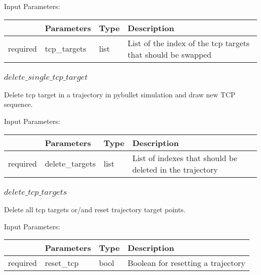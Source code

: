 \documentclass[
	ngerman,
	accentcolor=9c,%
	type=intern,
	marginpar=false
	]{tudapub}
\begin{document}
\vspace{0.5cm}
\noindent Input Parameters:
\vspace{0.5cm}

\begin{tabular}{|p{}|p{}|p{}| p{}|}
\hline
 & \textbf{Parameters} & \textbf{Type} & \textbf{Description} \\
\hline
required & tcp\_targets & list & List of the index of the tcp targets that should be swapped\\
\hline
\end{tabular}
\vspace{1cm}

\subsubsection{$delete\_single\_tcp\_target$}
\noindent Delete tcp target in a trajectory in pybullet simulation and draw new TCP sequence.


\vspace{0.5cm}
\noindent Input Parameters:
\vspace{0.5cm}

\begin{tabular}{|p{}|p{}|p{}| p{}|}
\hline
 & \textbf{Parameters} & \textbf{Type} & \textbf{Description} \\
\hline
required & delete\_targets & list & List of indexes that should be deleted in the trajectory \\
\hline
\end{tabular}
\vspace{1cm}


\subsubsection{$delete\_tcp\_targets$}
\noindent Delete all tcp targets or/and reset trajectory target points.

\vspace{0.5cm}
\noindent Input Parameters:
\vspace{0.5cm}

\begin{tabular}{|p{}|p{}|p{}| p{}|}
\hline
 & \textbf{Parameters} & \textbf{Type} & \textbf{Description} \\
\hline
required & reset\_tcp & bool & Boolean for resetting a trajectory\\
\hline
\end{tabular}
\vspace{1cm}
\end{document}
